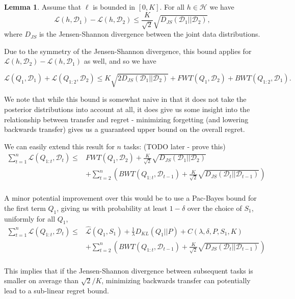 \documentclass[letterpaper]{article}
\theoremstyle{definition}
\newtheorem{lemma}{Lemma}[section]
\begin{document}
\begin{lemma}
	Assume that $\ell$ is bounded in $[0, K]$. For all $h\in \mathcal{H}$ we have
	$$\mathcal{L}(h, \mathcal{D}_1)-\mathcal{L}(h, \mathcal{D}_2)\leq \frac{K}{\sqrt{2}}\sqrt{D_{JS}(\mathcal{D}_1||\mathcal{D}_2)},$$ 
	where $D_{JS}$ is the Jensen-Shannon divergence between the joint data distributions.
\end{lemma}

Due to the symmetry of the Jensen-Shannon divergence, this bound applies for $\mathcal{L}(h, \mathcal{D}_2)-\mathcal{L}(h, \mathcal{D}_1)$ as well, and so we have

\begin{equation}
\mathcal{L}(Q_1, \mathcal{D}_1)+\mathcal{L}(Q_{1:2}, \mathcal{D}_2) \leq 
K\sqrt{2 D_{JS}(\mathcal{D}_1||\mathcal{D}_2)}+FWT(Q_1, \mathcal{D}_2)+ BWT(Q_{1:2}, \mathcal{D}_1).
\end{equation}

We note that while this bound is somewhat naive in that it does not take the posterior distributions into account at all, it does give us some insight into the relationship between transfer and regret - minimizing forgetting (and lowering backwards transfer) gives us a guaranteed upper bound on the overall regret. 

We can easily extend this result for $n$ tasks: (TODO later - prove this) %
\begin{equation}
\begin{split}
 \sum_{t=1}^{n}\mathcal{L}(Q_{1:t}, \mathcal{D}_t) \leq &  FWT(Q_1, \mathcal{D}_2) + \frac{K}{\sqrt{2}}\sqrt{D_{JS}(\mathcal{D}_{1}||\mathcal{D}_{2})} \\ &+ \sum_{t=2}^{n}\left ( BWT(Q_{1:t}, \mathcal{D}_{t-1})+ \frac{K}{\sqrt{2}}\sqrt{D_{JS}(\mathcal{D}_{t}||\mathcal{D}_{t-1})}\right ) \\&
 \end{split}
\end{equation}

A minor potential improvement over this would be to use a Pac-Bayes bound for the first term $Q_1$, giving us with probability at least $1-\delta$ over the choice of $S_1$, uniformly for all $Q_1$,
\begin{equation}
\begin{split}
\sum_{t=1}^{n}\mathcal{L}(Q_{1:t}, \mathcal{D}_t) \leq &  \hat{\mathcal{L}}(Q_1, S_1)+\frac{1}{\lambda}D_{KL}(Q_1||P)+C(\lambda,\delta,P,S_1, K) \\ &+ \sum_{t=2}^{n}\left ( BWT(Q_{1:t}, \mathcal{D}_{t-1})+ \frac{K}{\sqrt{2}}\sqrt{D_{JS}(\mathcal{D}_{t}||\mathcal{D}_{t-1})}\right ) \\&
\end{split}
\end{equation}

This implies that if the Jensen-Shannon divergence between subsequent tasks is smaller on average than $\sqrt{2}/K$, minimizing backwards transfer can potentially lead to a sub-linear regret bound.

\clearpage


\end{document}
